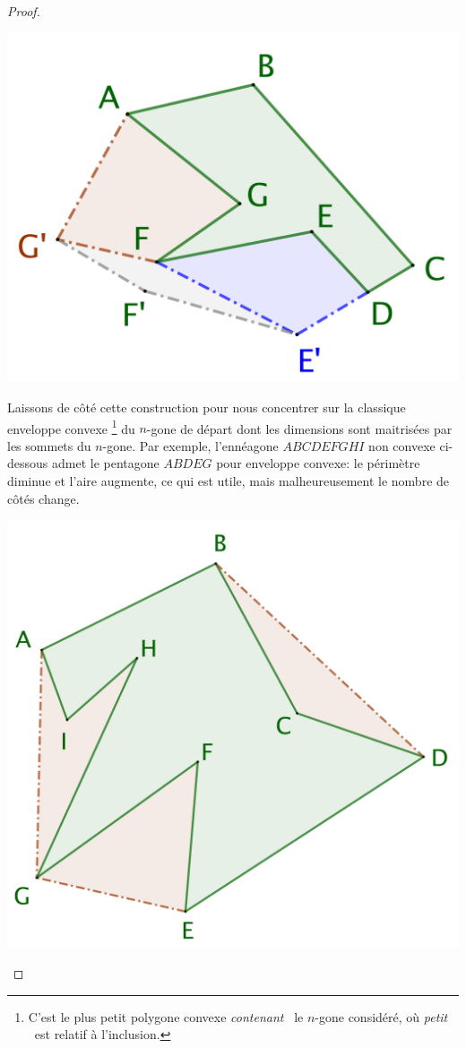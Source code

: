 \begin{proof}
	\begin{center}
		\includegraphics[scale=.4]{content/polygon/polygon-non-convex-bad.png}
	\end{center}


	Laissons de côté cette construction pour nous concentrer sur la classique enveloppe convexe%
	\footnote{
		C'est le plus petit polygone convexe \og \emph{contenant} \fg\ le $n$-gone considéré, où \og \emph{petit} \fg\ est relatif à l'inclusion.
	}
	du $n$-gone de départ dont les dimensions sont maitrisées par les sommets du $n$-gone.
	Par exemple, l'ennéagone $ABCDEFGHI$ non convexe ci-dessous admet le pentagone $ABDEG$ pour enveloppe convexe: le périmètre diminue et l'aire augmente, ce qui est utile, mais malheureusement le nombre de côtés change.
	
	\begin{center}
		\includegraphics[scale=.4]{content/polygon/polygon-convex-hull.png}
	\end{center}


\end{proof}
